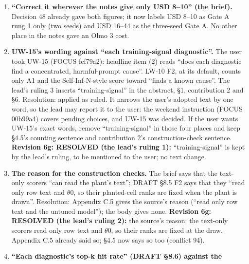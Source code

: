 \documentclass{article}
\theoremstyle{plain}
\theoremstyle{definition}
\theoremstyle{remark}
\begin{document}
\begin{enumerate}
        funding-gated, with one family as the fallback and Olmo 3 the first
        model cut'') sits in a sentence about 7--8B, and \S{}4.1's marker says
        ``first 7--8B model cut'', which the coordinator keeps. Resolution:
        unchanged; if a reader takes \S{}6's phrase as the first cut overall,
        add ``7--8B'' there (one word). \textbf{Revision 6f: RESOLVED (the
        lead's ruling 4): confirmed; unchanged.}
  \item \textbf{``Correct it wherever the notes give only USD 8--10'' (the
        brief).} Decision 48 already gave both figures; it now labels USD 8--10
        as Gate A rung 1 only (two seeds) and USD 16--44 as the three-seed Gate
        A. No other place in the notes gave an Olmo 3 cost.
  \item \textbf{UW-15's wording against ``each training-signal diagnostic''.}
        The user took UW-15 (FOCUS fcf79a2): headline item (2) reads ``does each
        diagnostic find a concentrated, harmful-prompt cause''. LW-10 F2, at its
        default, counts only A1 and the Self-Inf-N-style score toward ``finds a
        known cause''. The lead's ruling 3 inserts ``training-signal'' in the
        abstract, \S{}1, contribution 2 and \S{}6. Resolution: applied as ruled.
        It narrows the user's adopted text by one word, so the lead may report
        it to the user: the weekend instruction (FOCUS 00b99a4) covers pending
        choices, and UW-15 was decided. If the user wants UW-15's exact words,
        remove ``training-signal'' in those four places and keep \S{}4.5's
        counting sentence and contribution 2's construction-check sentence.
        \textbf{Revision 6g: RESOLVED (the lead's ruling 1):}
        ``training-signal'' is kept by the lead's ruling, to be mentioned to the
        user; no text change.
  \item \textbf{The reason for the construction checks.} The brief says that the
        text-only scorers ``can read the plant's text''; DRAFT \S{}8.5 F2 says
        that they ``read only row text and $\theta$0, so their planted-cell
        ranks are fixed when the plant is drawn''. Resolution: Appendix C.5
        gives the source's reason (``read only row text and the untuned
        model''); the body gives none. \textbf{Revision 6g: RESOLVED (the lead's
        ruling 2):} the source's reason: the text-only scorers read only row
        text and $\theta$0, so their ranks are fixed at the draw. Appendix C.5
        already said so; \S{}4.5 now says so too (conflict 94).
  \item \textbf{``Each diagnostic's top-k hit rate'' (DRAFT \S{}8.6) against the
}
\end{enumerate}
\end{document}
